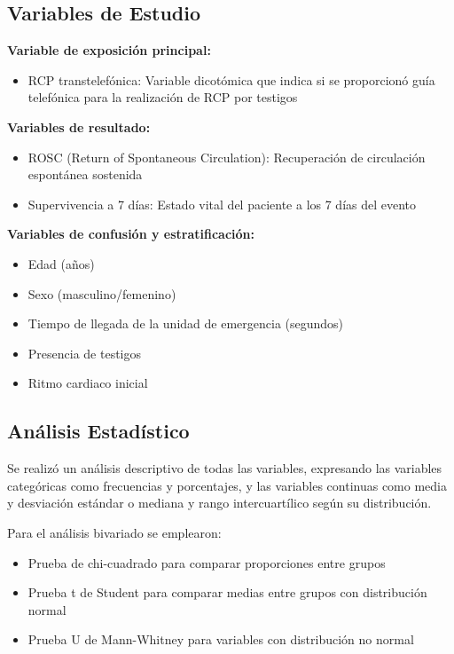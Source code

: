 \documentclass[10pt,a4paper]{article}
\begin{document}
\begin{multicols}{2}

\subsection{Variables de Estudio}

\textbf{Variable de exposición principal:}
\begin{itemize}
\item RCP transtelefónica: Variable dicotómica que indica si se proporcionó guía telefónica para la realización de RCP por testigos
\end{itemize}

\textbf{Variables de resultado:}
\begin{itemize}
\item ROSC (Return of Spontaneous Circulation): Recuperación de circulación espontánea sostenida
\item Supervivencia a 7 días: Estado vital del paciente a los 7 días del evento
\end{itemize}

\textbf{Variables de confusión y estratificación:}
\begin{itemize}
\item Edad (años)
\item Sexo (masculino/femenino)
\item Tiempo de llegada de la unidad de emergencia (segundos)
\item Presencia de testigos
\item Ritmo cardiaco inicial
\end{itemize}

\subsection{Análisis Estadístico}

Se realizó un análisis descriptivo de todas las variables, expresando las variables categóricas como frecuencias y porcentajes, y las variables continuas como media y desviación estándar o mediana y rango intercuartílico según su distribución.

Para el análisis bivariado se emplearon:
\begin{itemize}
\item Prueba de chi-cuadrado para comparar proporciones entre grupos
\item Prueba t de Student para comparar medias entre grupos con distribución normal
\item Prueba U de Mann-Whitney para variables con distribución no normal
\end{itemize}


\end{multicols}
\end{document}
